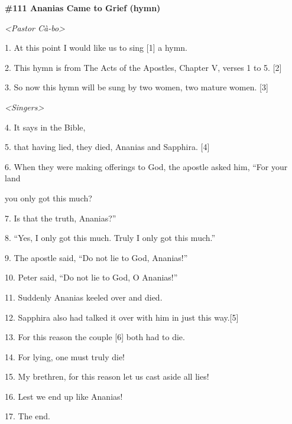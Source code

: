 
{\Large{}\textbf{\#111 Ananias Came to Grief (hymn)}}

{\Large{}\textit{<Pastor Cà-bo> }}

{\Large{}1. At this point I would like us to sing [1] a hymn.}

{\Large{}2. This hymn is from The Acts of the Apostles, Chapter V, verses 1 to
5. [2]}

{\Large{}3. So now this hymn will be sung by two women, two mature women. [3]}

{\Large{}\textit{<Singers>}}

{\Large{}4. It says in the Bible,}

{\Large{}5. that having lied, they died, Ananias and Sapphira. [4]}

{\Large{}6. When they were making offerings to God, the apostle asked him, ``For
your land     }

{\Large{}you only got this much?}

{\Large{}7. Is that the truth, Ananias?''}

{\Large{}8. ``Yes, I only got this much. Truly I only got this much.''}

{\Large{}9. The apostle said, ``Do not lie to God, Ananias!''}

{\Large{}10. Peter said, ``Do not lie to God, O Ananias!''}

{\Large{}11. Suddenly Ananias keeled over and died.}

{\Large{}12. Sapphira also had talked it over with him in just this way.[5]}

{\Large{}13. For this reason the couple [6] both had to die.}

{\Large{}14. For lying, one must truly die!}

{\Large{}15. My brethren, for this reason let us cast aside all lies!}

{\Large{}16. Lest we end up like Ananias!}

{\Large{}17. The end.}

